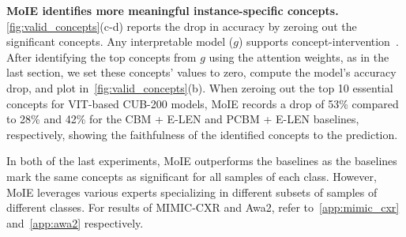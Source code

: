 \textbf{MoIE identifies more meaningful instance-specific concepts.} 
\cref{fig:valid_concepts}(c-d) reports the drop in accuracy by zeroing out the significant concepts.
Any interpretable model ($g$) supports concept-intervention~\cite{koh2020concept}. 
After identifying the top concepts from $g$ using the attention weights, as in the last section, we set these concepts' values to zero, compute the model's accuracy drop, and plot in~\cref{fig:valid_concepts}(b). When zeroing out the top 10 essential concepts for VIT-based CUB-200 models, MoIE records a drop of 53\% compared to 28\% and 42\% for the CBM + E-LEN and PCBM + E-LEN baselines, respectively, showing the faithfulness of the identified concepts to the prediction.

In both of the last experiments, MoIE outperforms the baselines as the baselines mark the same concepts as significant for all samples of each class. However,
MoIE leverages various experts specializing in different subsets of samples of different classes. 
For results of MIMIC-CXR and Awa2, refer to~\cref{app:mimic_cxr} and~\cref{app:awa2} respectively.



